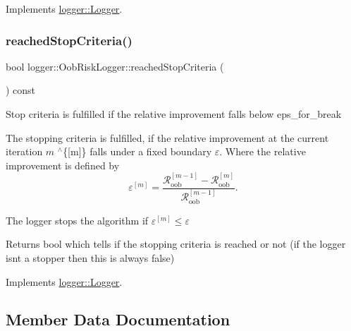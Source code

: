 Implements \mbox{\hyperlink{classlogger_1_1_logger_abad818a7e8053ca84cb267e883b5e377}{logger\+::\+Logger}}.

\mbox{\label{classlogger_1_1_oob_risk_logger_a5c1c8358ffcb5f5463b43f068ea21aa4}} 
\subsubsection{\texorpdfstring{reached\+Stop\+Criteria()}{reachedStopCriteria()}}
{\footnotesize\ttfamily bool logger\+::\+Oob\+Risk\+Logger\+::reached\+Stop\+Criteria (\begin{DoxyParamCaption}{ }\end{DoxyParamCaption}) const\hspace{0.3cm}{\ttfamily [virtual]}}



Stop criteria is fulfilled if the relative improvement falls below {\ttfamily eps\+\_\+for\+\_\+break} 

The stopping criteria is fulfilled, if the relative improvement at the current iteration $m$ $^\wedge$\{\mbox{[}m\mbox{]}\} falls under a fixed boundary $\varepsilon$. Where the relative improvement is defined by \[ \varepsilon^{[m]} = \frac{\mathcal{R}_\mathrm{oob}^{[m-1]} - \mathcal{R}_\mathrm{oob}^{[m]}}{\mathcal{R}_\mathrm{oob}^{[m-1]}}. \]

The logger stops the algorithm if $\varepsilon^{[m]} \leq \varepsilon$

\begin{DoxyReturn}{Returns}
{\ttfamily bool} which tells if the stopping criteria is reached or not (if the logger isn\textquotesingle{}t a stopper then this is always false) 
\end{DoxyReturn}


Implements \mbox{\hyperlink{classlogger_1_1_logger_aed91421c07062b91cee158ef2bda7ae8}{logger\+::\+Logger}}.



\subsection{Member Data Documentation}
\mbox{\label{classlogger_1_1_oob_risk_logger_a6dccaf686895c4a3f9eb88a8f74e65fa}} 
